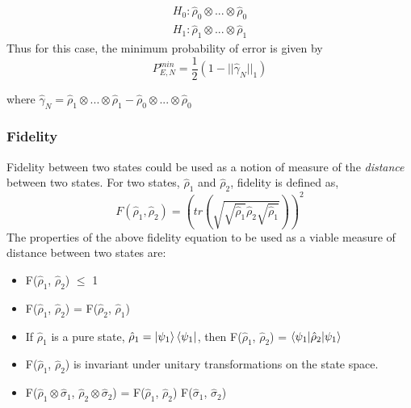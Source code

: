 \begin{equation}
    \begin{split}
        H_0: \hat{\rho}_0 \otimes ... \otimes \hat{\rho}_0\\
        H_1: \hat{\rho}_1 \otimes ... \otimes \hat{\rho}_1
    \end{split}
\end{equation}
Thus for this case, the minimum probability of error is given by
\begin{equation}
    P_{E, N}^{min} = \frac{1}{2} (1 - ||\hat{\gamma}_N||_1)
    \label{eq:311e}
\end{equation}

where $\hat{\gamma}_N = \hat{\rho}_1 \otimes ... \otimes \hat{\rho}_1 - \hat{\rho}_0 \otimes ... \otimes \hat{\rho}_0$

\subsubsection{Fidelity}
Fidelity between two states could be used as a notion of measure of the \textit{distance} between two states. For two states, $\hat{\rho}_1$ and $\hat{\rho}_2$, fidelity is defined as,
\begin{equation}
    F(\hat{\rho}_1, \hat{\rho}_2) = \left(tr\left(\sqrt{\sqrt{\hat{\rho}_1} \hat{\rho}_2 \sqrt{\hat{\rho}_1}} \right)\right)^2
\end{equation}
The properties of the above fidelity equation to be used as a viable measure of distance between two states are:
\begin{itemize}
    \item F($\hat{\rho}_1$, $\hat{\rho}_2$) $\le$ 1
    \item F($\hat{\rho}_1$, $\hat{\rho}_2$) = F($\hat{\rho}_2$, $\hat{\rho}_1$)
    \item If $\hat{\rho}_1$ is a pure state, $\hat{\rho}_1 = \ket{\psi_1}\bra{\psi_1}$, then F($\hat{\rho}_1$, $\hat{\rho}_2$) = $\braket{\psi_1|\hat{\rho}_2|\psi_1}$
    \item F($\hat{\rho}_1$, $\hat{\rho}_2$) is invariant under unitary transformations on the state space.
    \item F($\hat{\rho}_1 \otimes \hat{\sigma}_1$, $\hat{\rho}_2 \otimes \hat{\sigma}_2$) = F($\hat{\rho}_1$, $\hat{\rho}_2$) F($\hat{\sigma}_1$, $\hat{\sigma}_2$)
\end{itemize}

